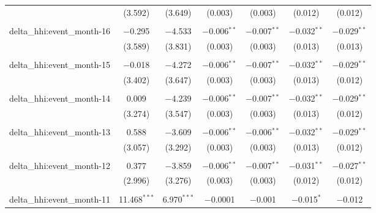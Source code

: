 \begin{table}[H]
{\begin{tabular}{@{\extracolsep{5pt}}lcccccc}
   & (3.592) & (3.649) & (0.003) & (0.003) & (0.012) & (0.012) \\  

   & & & & & & \\  

  delta\_hhi:event\_month-16 & $-$0.295 & $-$4.533 & $-$0.006$^{**}$ & $-$0.007$^{**}$ & $-$0.032$^{**}$ & $-$0.029$^{**}$ \\  

   & (3.589) & (3.831) & (0.003) & (0.003) & (0.013) & (0.013) \\  

   & & & & & & \\  

  delta\_hhi:event\_month-15 & $-$0.018 & $-$4.272 & $-$0.006$^{**}$ & $-$0.007$^{**}$ & $-$0.032$^{**}$ & $-$0.029$^{**}$ \\  

   & (3.402) & (3.647) & (0.003) & (0.003) & (0.013) & (0.012) \\  

   & & & & & & \\  

  delta\_hhi:event\_month-14 & 0.009 & $-$4.239 & $-$0.006$^{**}$ & $-$0.007$^{**}$ & $-$0.032$^{**}$ & $-$0.029$^{**}$ \\  

   & (3.274) & (3.547) & (0.003) & (0.003) & (0.013) & (0.012) \\  

   & & & & & & \\  

  delta\_hhi:event\_month-13 & 0.588 & $-$3.609 & $-$0.006$^{**}$ & $-$0.006$^{**}$ & $-$0.032$^{**}$ & $-$0.029$^{**}$ \\  

   & (3.057) & (3.292) & (0.003) & (0.003) & (0.013) & (0.012) \\  

   & & & & & & \\  

  delta\_hhi:event\_month-12 & 0.377 & $-$3.859 & $-$0.006$^{**}$ & $-$0.007$^{**}$ & $-$0.031$^{**}$ & $-$0.027$^{**}$ \\  

   & (2.996) & (3.276) & (0.003) & (0.003) & (0.012) & (0.012) \\  

   & & & & & & \\  

  delta\_hhi:event\_month-11 & 11.468$^{***}$ & 6.970$^{***}$ & $-$0.0001 & $-$0.001 & $-$0.015$^{*}$ & $-$0.012 \\  


\end{tabular}}
\end{table}
